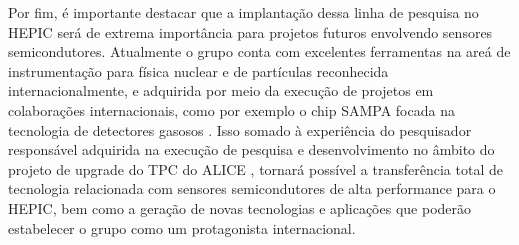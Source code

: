 Por fim, é importante destacar que a implantação dessa linha de pesquisa no HEPIC será de extrema importância para projetos futuros envolvendo sensores semicondutores. Atualmente o grupo conta com excelentes ferramentas na areá de instrumentação para física nuclear e de partículas reconhecida internacionalmente, e adquirida por meio da execução de projetos em colaborações internacionais, como por exemplo o chip SAMPA focada na tecnologia de detectores gasosos \cite{ref1}. Isso somado à experiência do pesquisador responsável adquirida na execução de pesquisa e desenvolvimento no âmbito do projeto de upgrade do TPC do ALICE \cite{tpcNIM,discharge_paper}, tornará possível a transferência total de tecnologia relacionada com sensores semicondutores de alta performance para o HEPIC, bem como a geração de novas tecnologias e aplicações que poderão estabelecer o grupo como um protagonista internacional.